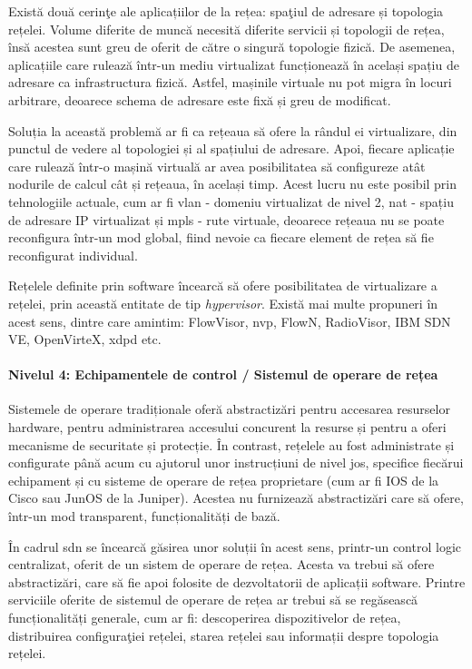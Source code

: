 Există două cerinţe ale aplicațiilor de la rețea: spaţiul de adresare și topologia rețelei. Volume diferite de muncă necesită diferite servicii și topologii de rețea, însă acestea sunt greu de oferit de către o singură topologie fizică. De asemenea, aplicațiile care rulează într-un mediu virtualizat funcționează în același spațiu de adresare ca infrastructura fizică. Astfel, mașinile virtuale nu pot migra în locuri arbitrare, deoarece schema de adresare este fixă și greu de modificat.

Soluția la această problemă ar fi ca rețeaua să ofere la rândul ei virtualizare, din punctul de vedere al topologiei și al spațiului de adresare. Apoi, fiecare aplicație care rulează într-o mașină virtuală ar avea posibilitatea să configureze atât nodurile de calcul cât și rețeaua, în același timp. Acest lucru nu este posibil prin tehnologiile actuale, cum ar fi \gls{vlan} - domeniu virtualizat de nivel 2, \gls{nat} - spațiu de adresare IP virtualizat și \gls{mpls} - rute virtuale, deoarece rețeaua nu se poate reconfigura într-un mod global, fiind nevoie ca fiecare element de rețea să fie reconfigurat individual.

Rețelele definite prin software încearcă să ofere posibilitatea de virtualizare a rețelei, prin această entitate de tip \textit{hypervisor}. Există mai multe propuneri în acest sens, dintre care amintim: FlowVisor, \gls{nvp}, FlowN, RadioVisor, IBM SDN VE, OpenVirteX, \gls{xdpd} etc.

\paragraph{Nivelul 4: Echipamentele de control / Sistemul de operare de rețea}

Sistemele de operare tradiționale oferă abstractizări pentru accesarea resurselor hardware, pentru administrarea accesului concurent la resurse și pentru a oferi mecanisme de securitate și protecție. În contrast, rețelele au fost administrate și configurate până acum cu ajutorul unor instrucțiuni de nivel jos, specifice fiecărui echipament și cu sisteme de operare de rețea proprietare (cum ar fi IOS de la Cisco sau JunOS de la Juniper). Acestea nu furnizează abstractizări care să ofere, într-un mod transparent, funcționalități de bază.

În cadrul \gls{sdn} se încearcă găsirea unor soluții în acest sens, printr-un control logic centralizat, oferit de un sistem de operare de rețea. Acesta va trebui să ofere abstractizări, care să fie apoi folosite de dezvoltatorii de aplicații software. Printre serviciile oferite de sistemul de operare de rețea ar trebui să se regăsească funcționalități generale, cum ar fi: descoperirea dispozitivelor de rețea, distribuirea configuraţiei rețelei, starea rețelei sau informații despre topologia rețelei.

